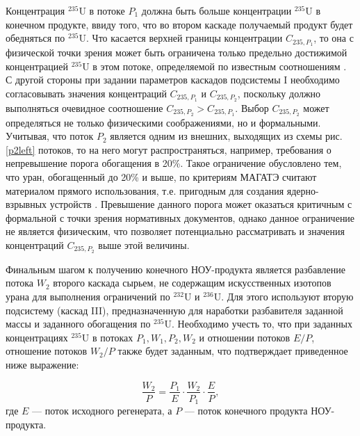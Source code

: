 Концентрация $^{235}$U в потоке $P_1$ должна быть больше концентрации $^{235}$U в конечном продукте, ввиду того, что во втором каскаде получаемый продукт будет обедняться по $^{235}$U. Что касается верхней границы концентрации ${C}_{235,{P_1}}$, то она с физической точки зрения может быть ограничена только предельно достижимой концентрацией $^{235}$U в этом потоке, определяемой по известным соотношениям \cite{minenkoPredelnoeObogashcheniePromezhutochnyh1972,sulaberidzeOsobennostiObogashcheniyaKomponentov2006}. С другой стороны при задании параметров каскадов подсистемы I необходимо согласовывать значения концентраций ${C}_{235,{P_1}}$ и ${C}_{235,{P_2}}$, поскольку должно выполняться очевидное соотношение ${C}_{235,{P_2}}{>}{C}_{235,{P_1}}$.
Выбор $C_{235,{P_2}}$ может определяться не только физическими соображениями, но и формальными. Учитывая, что поток $P_2$ является одним из внешних, выходящих из схемы рис. \ref{p2left} потоков, то на него могут распространяться, например, требования о непревышение порога обогащения в 20\%. Такое ограничение обусловлено тем, что уран, обогащенный до 20\% и выше, по критериям МАГАТЭ считают материалом прямого использования, т.е. пригодным для создания ядерно-взрывных устройств \cite{brownOriginsSignificanceLimit2016,pshakinYadernoeNerasprostranenie2006}. Превышение данного порога может оказаться критичным с формальной с точки зрения нормативных документов, однако данное ограничение не является физическим, что позволяет потенциально рассматривать и значения концентраций  $C_{235,{P_2}}$ выше этой величины. 

Финальным шагом к получению конечного НОУ-продукта является разбавление потока $W_2$ второго каскада сырьем, не содержащим искусственных изотопов урана для выполнения ограничений по $^{232}$U и $^{236}$U.
Для этого используют вторую подсистему (каскад III), предназначенную для наработки разбавителя заданной массы и заданного обогащения по $^{235}$U.
Необходимо учесть то, что при заданных концентрациях $^{235}$U в потоках ${P_1}, {W_1}, {P_2}, {W_2}$ и отношении потоков $E/P$, отношение потоков ${W_2}{/P}$ также будет заданным, что подтверждает приведенное ниже выражение:

\begin{equation}
    \label{dc1}
    \frac{W_{2}}{P}=\frac{P_{1}}{E}\cdot\frac{W_{2}}{P_{1}}\cdot\frac{E}{P},
\end{equation}
где $E$ --- поток исходного регенерата, а $P$ --- поток конечного продукта НОУ-продукта.

